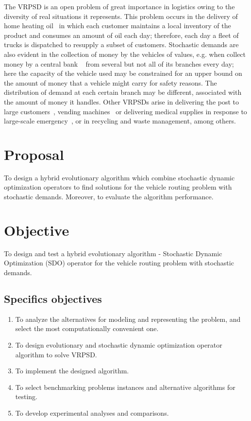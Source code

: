 The VRPSD is an open problem of great importance in logistics owing to the diversity of real situations it represents. This problem occurs in the delivery of home heating oil~\cite{dror_computational_1985} in which each customer maintains a local inventory of the product and consumes an amount of oil each day; therefore, each day a fleet of trucks is dispatched to resupply a subset of customers. Stochastic demands are also evident in the collection of money by the vehicles of values, e.g. when collect money by a central bank ~\cite{jianhua_fan_multiple_2006} from several but not all of its branches every day; here the capacity of the vehicle used may be constrained for an upper bound on the amount of money that a vehicle might carry for safety reasons. The distribution of demand at each certain branch may be different, associated with the amount of money it handles. Other VRPSDs arise in delivering the post to large customers~\cite{Markovic_2005}, vending machines~\cite{yang_stochastic_2000} or delivering medical supplies in response to large-scale emergency~\cite{dessouky_rapid_2006}, or in recycling and waste management, among others.

\section{Proposal}

To design a hybrid evolutionary algorithm which combine stochastic dynamic optimization operators to find solutions for the vehicle routing problem with stochastic demands. Moreover, to evaluate the algorithm performance.


\section{Objective}

To design and test a hybrid evolutionary algorithm - Stochastic Dynamic Optimization (SDO) operator for the vehicle routing problem with stochastic demands.

\subsection{Specifics objectives}

\begin{enumerate}
 \item To analyze the alternatives for modeling and representing the problem, and select the most computationally convenient one.
 \item To design evolutionary and stochastic dynamic optimization operator algorithm to solve VRPSD.
 \item To implement the designed algorithm.
 \item To select benchmarking problems instances and alternative algorithms for testing.
 \item To develop experimental analyses and comparisons.
\end{enumerate}

